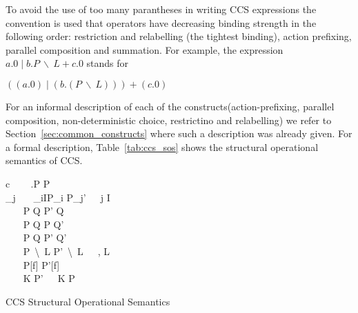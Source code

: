 	To avoid the use of too many parantheses in writing CCS expressions 
	the convention is used that operators have decreasing binding strength in 
	the following order: restriction and relabelling (the tightest binding), 
	action prefixing, parallel composition and summation. For example, the 
	expression $a.0 \mid b.P\ \backslash\ L + c.0$ stands for
		
	\begin{center}$((a.0) \mid (b.(P\ \backslash\ L))) + (c.0)$\end{center}
		
	For an informal description of each of the constructs(action-prefixing, 
	parallel composition, non-deterministic choice, restrictino and relabelling) 
	we refer to Section~\ref{sec:common_constructs} where such a description was 
	already given. For a formal description, Table~\ref{tab:ccs_sos} shows the 
	structural operational semantics of CCS.


\begin{table}[t]
\begin{ARRAY}{c}
	\ \ \ \Inference{                              }
	                            {\alpha.P \infarrow{\alpha} P} \vspace{10pt}\\
	_j\ \ \ 
	                              {\sum_{i\in I}P_i \infarrow{\alpha} P_j'}\ \ \ j \in I\vspace{10pt}\\
	\ \ \ 
	                             {P \mid Q \infarrow{\alpha} P' \mid Q} \vspace{10pt}\\
	\ \ \ 
	                             {P \mid Q \infarrow{\alpha} P \mid Q'} \vspace{10pt}\\
	\ \ \ 
	                             {P \mid Q \infarrow{\tau} P' \mid Q'} \vspace{10pt}\\
	\ \ \ 
	                              {P\ \backslash\ L \infarrow{\alpha} P'\  \backslash\ L}\ \ \ \alpha, \overline{\alpha} \notin L\vspace{10pt}\\
	\ \ \ 
	                             {P[f]  P'[f]} \vspace{10pt}\\
	\ \ \ 
	                             {K \infarrow{\alpha} P'}\ \ \ K  P

\end{ARRAY}
\caption{CCS Structural Operational Semantics}
\label{tab:ccs_sos}
\end{table}
	

